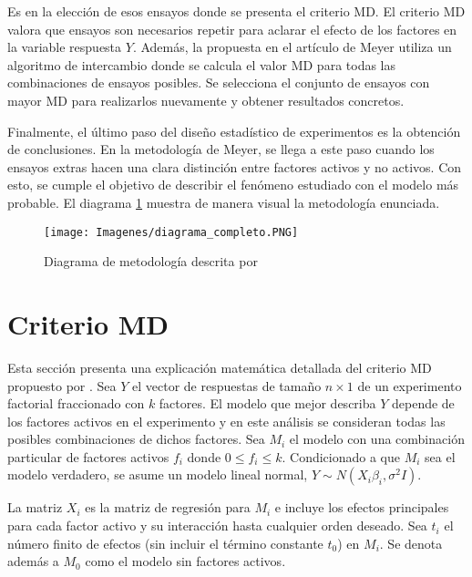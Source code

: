 Es en la elección de esos ensayos donde se presenta el criterio MD. El criterio MD valora que ensayos son necesarios repetir para aclarar el efecto de los factores en la variable respuesta $Y$. Además, la propuesta en el artículo de Meyer utiliza un algoritmo de intercambio donde se calcula el valor MD para todas las combinaciones de ensayos posibles. Se selecciona el conjunto de ensayos con mayor MD para realizarlos nuevamente y obtener resultados concretos. 

Finalmente, el último paso del diseño estadístico de experimentos es la obtención de conclusiones. En la metodología de Meyer, se llega a este paso cuando los ensayos extras hacen una clara distinción entre factores activos y no activos. Con esto, se cumple el objetivo de describir el fenómeno estudiado con el modelo más probable. El diagrama \ref{diagrama_completo} muestra de manera visual la metodología enunciada. 

\begin{figure}[h]
	\begin{center}
		\texttt{[image: Imagenes/diagrama\_completo.PNG]}
		\caption{Diagrama de metodología descrita por \cite{meyer1996}}
		\label{diagrama_completo}
	\end{center}
\end{figure} 



\section{Criterio MD} \label{seccion_criterioMD}

Esta sección presenta una explicación matemática detallada del criterio MD propuesto por \cite{meyer1996}. Sea \textbf{$Y$} el vector de respuestas de tamaño $n \times 1$ de un experimento factorial fraccionado con $k$ factores. El modelo que mejor describa \textbf{$Y$} depende de los factores activos en el experimento y en este análisis se consideran todas las posibles combinaciones de dichos factores. Sea $M_i$ el modelo con una combinación particular de factores activos $f_i$ donde $0 \leq f_i \leq k$. Condicionado a que $M_i$ sea el modelo verdadero, se asume un modelo lineal normal, $\textbf{$Y$} \sim N(X_i \beta_i, \sigma^2 I).$ 

La matriz $X_i$ es la matriz de regresión para $M_i$ e incluye los efectos principales para cada factor activo y su interacción hasta cualquier orden deseado. Sea $t_i$ el número finito de efectos (sin incluir el término constante $t_0$) en $M_i$. Se denota además a $M_0$ como el modelo sin factores activos. 

